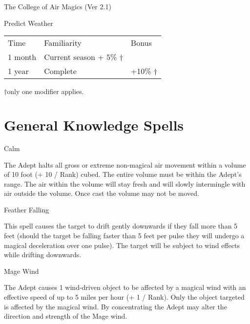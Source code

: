 \begin{Chapter}{The College of Air Magics (Ver 2.1)}
\begin{talent}[T-3]{Predict Weather}
\begin{effects}
\begin{tabularx}{\columnwidth}{XXX}
Time 	& Familiarity & Bonus \\
1 month & Current season  + 5\% † \\
1 year  &Complete & +10\% † \\
\end{tabularx}
†only one modifier applies.
\end{effects}
\end{talent}


\section{General Knowledge Spells}

\begin{spell}[G-1]{Calm}

\begin{effects}
The Adept halts all gross or extreme non-magical air movement within a
volume of 10 foot (+ 10 / Rank) cubed.  The entire volume must be
within the Adept’s range.  The air within the volume will stay fresh
and will slowly intermingle with air outside the volume. Once cast the
volume may not be moved.
\end{effects}
\end{spell}

\begin{spell}[G-2]{Feather Falling}

\begin{effects}
This spell causes the target to drift gently downwards if they fall
more than 5 feet (should the target be falling faster than 5 feet per
pulse they will undergo a magical deceleration over one pulse).  The
target will be subject to wind effects while drifting downwards.

\end{effects}
\end{spell}

\begin{spell}[G-3]{Mage Wind}

\begin{effects}
The Adept causes 1 wind-driven object to be affected by a magical wind
with an effective speed of up to 5 miles per hour (+ 1 / Rank). Only
the object targeted is affected by the magical wind.  By concentrating
the Adept may alter the direction and strength of the Mage wind.
\end{effects}
\end{spell}


\end{Chapter}
